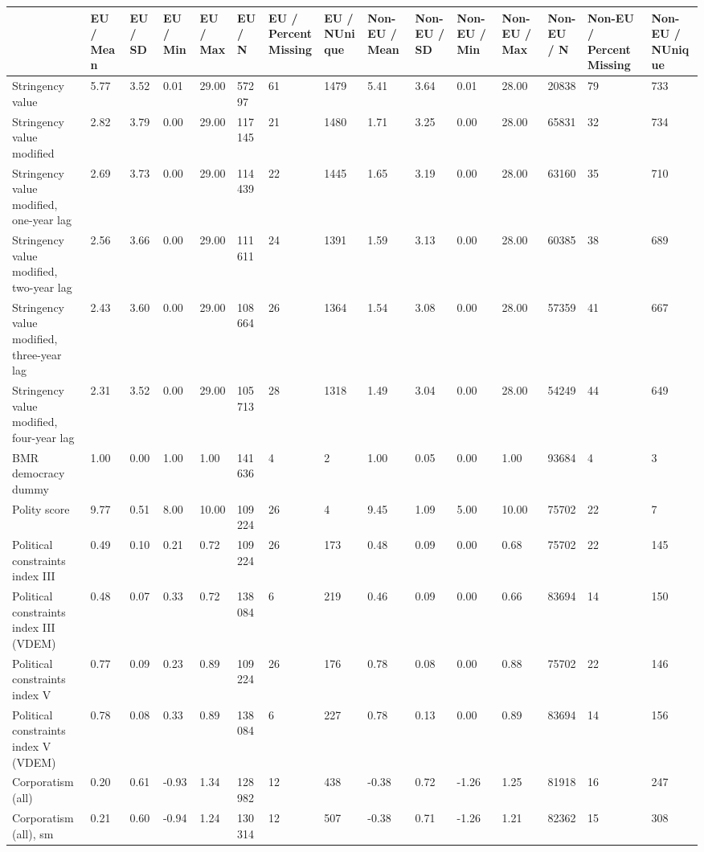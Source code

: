 
\begin{longtable}{lllllllllllllll}
\toprule
  & EU / Mean & EU / SD & EU / Min & EU / Max & EU / N & EU / PercentMissing & EU / NUnique & Non-EU / Mean & Non-EU / SD & Non-EU / Min & Non-EU / Max & Non-EU / N & Non-EU / PercentMissing & Non-EU / NUnique\\
\midrule
Stringency value & 5.77 & 3.52 & 0.01 & 29.00 & 57297 & 61 & 1479 & 5.41 & 3.64 & 0.01 & 28.00 & 20838 & 79 & 733\\
Stringency value modified & 2.82 & 3.79 & 0.00 & 29.00 & 117145 & 21 & 1480 & 1.71 & 3.25 & 0.00 & 28.00 & 65831 & 32 & 734\\
Stringency value modified, one-year lag & 2.69 & 3.73 & 0.00 & 29.00 & 114439 & 22 & 1445 & 1.65 & 3.19 & 0.00 & 28.00 & 63160 & 35 & 710\\
Stringency value modified, two-year lag & 2.56 & 3.66 & 0.00 & 29.00 & 111611 & 24 & 1391 & 1.59 & 3.13 & 0.00 & 28.00 & 60385 & 38 & 689\\
Stringency value modified, three-year lag & 2.43 & 3.60 & 0.00 & 29.00 & 108664 & 26 & 1364 & 1.54 & 3.08 & 0.00 & 28.00 & 57359 & 41 & 667\\
\addlinespace
Stringency value modified, four-year lag & 2.31 & 3.52 & 0.00 & 29.00 & 105713 & 28 & 1318 & 1.49 & 3.04 & 0.00 & 28.00 & 54249 & 44 & 649\\
BMR democracy dummy & 1.00 & 0.00 & 1.00 & 1.00 & 141636 & 4 & 2 & 1.00 & 0.05 & 0.00 & 1.00 & 93684 & 4 & 3\\
Polity score & 9.77 & 0.51 & 8.00 & 10.00 & 109224 & 26 & 4 & 9.45 & 1.09 & 5.00 & 10.00 & 75702 & 22 & 7\\
Political constraints index III & 0.49 & 0.10 & 0.21 & 0.72 & 109224 & 26 & 173 & 0.48 & 0.09 & 0.00 & 0.68 & 75702 & 22 & 145\\
Political constraints index III (VDEM) & 0.48 & 0.07 & 0.33 & 0.72 & 138084 & 6 & 219 & 0.46 & 0.09 & 0.00 & 0.66 & 83694 & 14 & 150\\
\addlinespace
Political constraints index V & 0.77 & 0.09 & 0.23 & 0.89 & 109224 & 26 & 176 & 0.78 & 0.08 & 0.00 & 0.88 & 75702 & 22 & 146\\
Political constraints index V (VDEM) & 0.78 & 0.08 & 0.33 & 0.89 & 138084 & 6 & 227 & 0.78 & 0.13 & 0.00 & 0.89 & 83694 & 14 & 156\\
Corporatism (all) & 0.20 & 0.61 & -0.93 & 1.34 & 128982 & 12 & 438 & -0.38 & 0.72 & -1.26 & 1.25 & 81918 & 16 & 247\\
Corporatism (all), sm & 0.21 & 0.60 & -0.94 & 1.24 & 130314 & 12 & 507 & -0.38 & 0.71 & -1.26 & 1.21 & 82362 & 15 & 308\\

\end{longtable}
